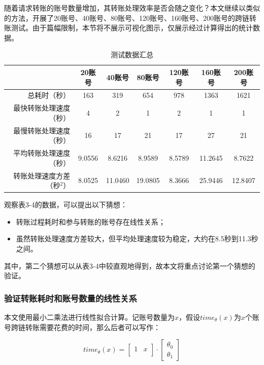 随着请求转账的账号数量增加，其转账处理效率是否会随之变化？本文继续以类似的方法，开展了20账号、40账号、80账号、120账号、160账号、200账号的跨链转账测试。由于篇幅限制，本节将不展示可视化图示，仅展示经过计算得出的统计数据。

\begin{table}[htbp]
    \linespread{1.5}
    \centering
    \caption{测试数据汇总}\label{测试数据汇总}
    \begin{tabular}{r|c|c|c|c|c|c} \toprule
                        & 20账号   & 40账号    & 80账号    & 120账号  & 160账号   & 200账号   \\\hline
        总耗时（秒）          & 163    & 319     & 654     & 978    & 1363    & 1621    \\
        最快转账处理速度（秒）     & 4      & 2       & 1       & 2      & 1       & 1       \\
        最慢转账处理速度（秒）     & 16     & 17      & 21      & 17     & 27      & 21      \\
        平均转账处理速度（秒）     & 9.0556 & 8.6216  & 8.9589  & 8.5789 & 11.2645 & 8.7622  \\
        转账处理速度方差（秒$^2$） & 8.0525 & 11.0460 & 19.0805 & 8.3666 & 25.9446 & 12.8407 \\
        \bottomrule
    \end{tabular}
\end{table}

观察表3-4的数据，可以提出以下猜想：
\begin{itemize}
    \item 转账过程耗时和参与转账的账号存在线性关系；
    \item 虽然转账处理速度方差较大，但平均处理速度较为稳定，大约在8.5秒到11.3秒之间。
\end{itemize}

其中，第二个猜想可以从表3-4中较直观地得到，故本文将重点讨论第一个猜想的验证。

\subsubsection{验证转账耗时和账号数量的线性关系}

本文使用最小二乘法进行线性拟合计算。记账号数量为$x$，假设$time_\theta(x)$为$x$个账号跨链转账需要花费的时间，那么后者可以写作：

$$
    time_\theta(x) =
    \begin{bmatrix}
        1 & x \\
    \end{bmatrix}
    \cdot
    \begin{bmatrix}
        \theta_0 \\
        \theta_1
    \end{bmatrix}
$$

